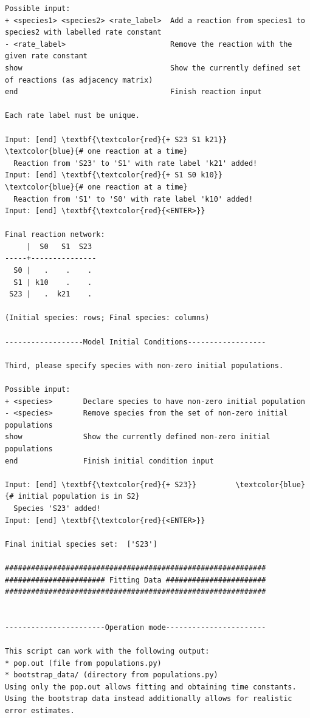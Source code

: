 \documentclass[a4paper,11pt,DIV=15,openany]{scrbook}
\begin{document}
\begin{oframed}
\begin{Verbatim}[commandchars=\\\{\}]
Possible input:
+ <species1> <species2> <rate_label>  Add a reaction from species1 to species2 with labelled rate constant
- <rate_label>                        Remove the reaction with the given rate constant
show                                  Show the currently defined set of reactions (as adjacency matrix)
end                                   Finish reaction input

Each rate label must be unique.

Input: [end] \textbf{\textcolor{red}{+ S23 S1 k21}}    \textcolor{blue}{# one reaction at a time}
  Reaction from 'S23' to 'S1' with rate label 'k21' added!
Input: [end] \textbf{\textcolor{red}{+ S1 S0 k10}}     \textcolor{blue}{# one reaction at a time}
  Reaction from 'S1' to 'S0' with rate label 'k10' added!
Input: [end] \textbf{\textcolor{red}{<ENTER>}}

Final reaction network:
     |  S0   S1  S23 
-----+---------------
  S0 |   .    .    . 
  S1 | k10    .    . 
 S23 |   .  k21    . 

(Initial species: rows; Final species: columns)

------------------Model Initial Conditions------------------

Third, please specify species with non-zero initial populations.

Possible input:
+ <species>       Declare species to have non-zero initial population
- <species>       Remove species from the set of non-zero initial populations
show              Show the currently defined non-zero initial populations
end               Finish initial condition input

Input: [end] \textbf{\textcolor{red}{+ S23}}         \textcolor{blue}{# initial population is in S2}
  Species 'S23' added!
Input: [end] \textbf{\textcolor{red}{<ENTER>}}

Final initial species set:  ['S23']

############################################################
####################### Fitting Data #######################
############################################################


-----------------------Operation mode-----------------------

This script can work with the following output:
* pop.out (file from populations.py)
* bootstrap_data/ (directory from populations.py)
Using only the pop.out allows fitting and obtaining time constants.
Using the bootstrap data instead additionally allows for realistic error estimates.


\end{Verbatim}
\end{oframed}
\end{document}
